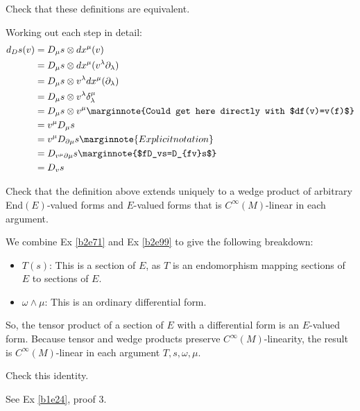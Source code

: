 \documentclass[10pt]{article}
\begin{document}
\begin{example}
	Check that these definitions are equivalent.
\end{example}
\sol Working out each step in detail:
$$
\begin{aligned}
	d_Ds(v) &= D_\mu s \otimes dx^\mu(v)\\
	&= D_\mu s \otimes dx^\mu(v^\lambda \partial_\lambda)\\
	&= D_\mu s \otimes v^\lambda dx^\mu(\partial_\lambda)\\
	&= D_\mu s \otimes v^\lambda \delta^\mu_\lambda\\
	&= D_\mu s \otimes v^\mu \marginnote{Could get here directly with $df(v)=v(f)$}\\
	&= v^\mu D_\mu s \\
	&= v^\mu D_{\partial\mu} s \marginnote{Explicit notation}\\
	&= D_{v^\mu \partial\mu} s \marginnote{$fD_vs=D_{fv}s$}\\
	&= D_v s \\
\end{aligned}
$$


\begin{example}\label{b2e101}
	Check that the definition above extends uniquely to a wedge product of arbitrary End$(E)$-valued forms and $E$-valued forms that is $C^\infty(M)$-linear in each argument.
\end{example}
\sol We combine Ex \ref{b2e71} and Ex \ref{b2e99} to give the following breakdown:
\begin{itemize}
	\item $T(s)$: This is a section of $E$, as $T$ is an endomorphism mapping sections of $E$ to sections of $E$.
	\item $\omega\wedge\mu$: This is an ordinary differential form.
\end{itemize}
So, the tensor product of a section of $E$ with a differential form is an $E$-valued form. Because tensor and wedge products preserve $C^\infty(M)$-linearity, the result is $C^\infty(M)$-linear in each argument $T,s,\omega,\mu$.


\begin{example}
	Check this identity.
\end{example}
\sol See Ex \ref{b1e24}, proof 3.
\end{document}
